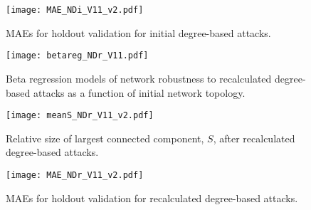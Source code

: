 

\begin{figure}[!htp]
\begin{center}
\texttt{[image: MAE\_NDi\_V11\_v2.pdf]}
\caption{\label{fig:ch2:maeNDi}MAEs for holdout validation for initial degree-based attacks.}
\end{center}
\end{figure}



\begin{figure}[!htp]
\begin{center}
\texttt{[image: betareg\_NDr\_V11.pdf]}
\caption{\label{fig:ch2:betaregNDr}Beta regression models of network robustness to recalculated degree-based attacks as a function of initial network topology.}
\end{center}
\end{figure}



\begin{figure}[!htp]
\begin{center}
\texttt{[image: meanS\_NDr\_V11\_v2.pdf]}
\caption{\label{fig:ch2:meanSNDr}Relative size of largest connected component, $S$, after recalculated degree-based attacks.}
\end{center}
\end{figure}



\begin{figure}[!htp]
\begin{center}
\texttt{[image: MAE\_NDr\_V11\_v2.pdf]}
\caption{\label{fig:ch2:maeNDr}MAEs for holdout validation for recalculated degree-based attacks.}
\end{center}
\end{figure}

